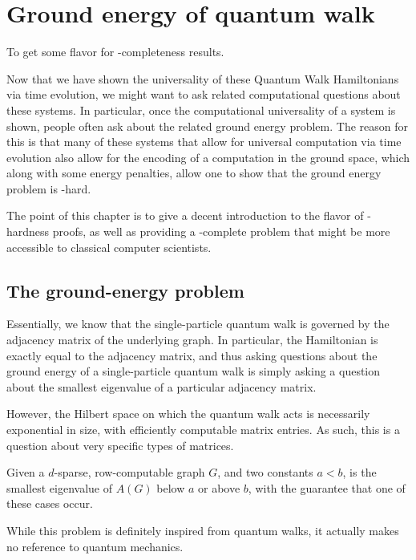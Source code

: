 \documentclass[../thesis-main/thesis-main]{subfiles}
\begin{document}
\chapter{Ground energy of quantum walk}
\label{chap:SP_ground}

To get some flavor for \QMA-completeness results.

Now that we have shown the universality of these Quantum Walk Hamiltonians via time evolution, we might want to ask related computational questions about these systems.  In particular, once the computational universality of a system is shown, people often ask about the related ground energy problem.  The reason for this is that many of these systems that allow for universal computation via time evolution also allow for the encoding of a computation in the ground space, which along with some energy penalties, allow one to show that the ground energy problem is \QMA-hard. 

The point of this chapter is to give a decent introduction to the flavor of \QMA-hardness proofs, as well as providing a \QMA-complete problem that might be more accessible to classical computer scientists.

\section{The ground-energy problem}

Essentially, we know that the single-particle quantum walk is governed by the adjacency matrix of the underlying graph.  In particular, the Hamiltonian is exactly equal to the adjacency matrix, and thus asking questions about the ground energy of a single-particle quantum walk is simply asking a question about the smallest eigenvalue of a particular adjacency matrix.

However, the Hilbert space on which the quantum walk acts is necessarily exponential in size, with efficiently computable matrix entries.  As such, this is a question about very specific types of matrices.

\begin{problem} Given a $d$-sparse, row-computable graph $G$, and two constants $a< b$, is the smallest eigenvalue of $A(G)$ below $a$ or above $b$, with the guarantee that one of these cases occur.
\end{problem}

While this problem is definitely inspired from quantum walks, it actually makes no reference to quantum mechanics.
\end{document}
